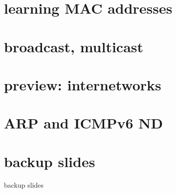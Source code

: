 


\section{learning MAC addresses}

\section{broadcast, multicast}

\section{preview: internetworks}

\section{ARP and ICMPv6 ND}

\section{backup slides}
\begin{frame}{backup slides}
\end{frame}


